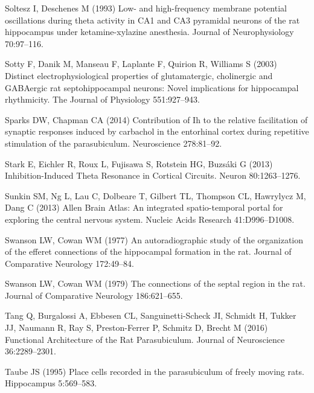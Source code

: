 \documentclass[
  12pt,
  a4paper,
  openany]{book}
\newlength{\cslhangindent}
\newlength{\cslentryspacingunit} %
\newenvironment{CSLReferences}[2] %
 {%
  \setlength{\parindent}{0pt}
  \ifodd #1
  \let\oldpar\par
  \def\par{\hangindent=\cslhangindent\oldpar}
  \fi
  \setlength{\parskip}{#2\cslentryspacingunit}
 }%
 {}
\begin{document}
\begin{CSLReferences}{1}{0}
\leavevmode{}%
Soltesz I, Deschenes M (1993) Low- and high-frequency membrane potential oscillations during theta activity in {CA1} and {CA3} pyramidal neurons of the rat hippocampus under ketamine-xylazine anesthesia. Journal of Neurophysiology 70:97--116.

\leavevmode{}%
Sotty F, Danik M, Manseau F, Laplante F, Quirion R, Williams S (2003) Distinct electrophysiological properties of glutamatergic, cholinergic and {GABAergic} rat septohippocampal neurons: Novel implications for hippocampal rhythmicity. The Journal of Physiology 551:927--943.

\leavevmode{}%
Sparks DW, Chapman CA (2014) Contribution of {Ih} to the relative facilitation of synaptic responses induced by carbachol in the entorhinal cortex during repetitive stimulation of the parasubiculum. Neuroscience 278:81--92.

\leavevmode{}%
Stark E, Eichler R, Roux L, Fujisawa S, Rotstein HG, Buzsáki G (2013) Inhibition-{Induced} {Theta} {Resonance} in {Cortical} {Circuits}. Neuron 80:1263--1276.

\leavevmode{}%
Sunkin SM, Ng L, Lau C, Dolbeare T, Gilbert TL, Thompson CL, Hawrylycz M, Dang C (2013) Allen {Brain} {Atlas}: An integrated spatio-temporal portal for exploring the central nervous system. Nucleic Acids Research 41:D996--D1008.

\leavevmode{}%
Swanson LW, Cowan WM (1977) An autoradiographic study of the organization of the efferet connections of the hippocampal formation in the rat. Journal of Comparative Neurology 172:49--84.

\leavevmode{}%
Swanson LW, Cowan WM (1979) The connections of the septal region in the rat. Journal of Comparative Neurology 186:621--655.

\leavevmode{}%
Tang Q, Burgalossi A, Ebbesen CL, Sanguinetti-Scheck JI, Schmidt H, Tukker JJ, Naumann R, Ray S, Preston-Ferrer P, Schmitz D, Brecht M (2016) Functional {Architecture} of the {Rat} {Parasubiculum}. Journal of Neuroscience 36:2289--2301.

\leavevmode{}%
Taube JS (1995) Place cells recorded in the parasubiculum of freely moving rats. Hippocampus 5:569--583.


\end{CSLReferences}
\end{document}
